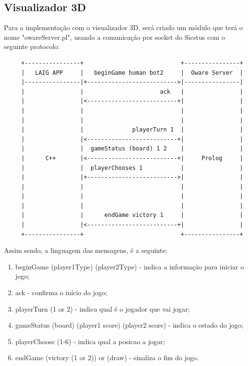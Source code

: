 \documentclass[15pt,a4paper]{article}
\begin{document}
\subsection*{Visualizador 3D}
Para a implementação com o visualizador 3D, será criado um módulo que terá o nome "owareServer.pl", usando a comunicação por socket do Sicstus com o seguinte protocolo:
\begin{verbatim}
     +----------------+                            +----------------+
     |   LAIG APP     |   beginGame human bot2     |  Oware Server  |
     |----------------|+-------------------------->|----------------|
     |                |                      ack   |                |
     |                |<--------------------------+|                |
     |                |                            |                |
     |                |                            |                |
     |                |              playerTurn 1  |                |
     |                |<--------------------------+|                |
     |                |  gameStatus (board) 1 2    |                |
     |      C++       |<--------------------------+|     Prolog     |
     |                |  playerChooses 1           |                |
     |                |+-------------------------->|                |
     |                |                            |                |
     |                |                            |                |
     |                |                            |                |
     |                |      endGame victory 1     |                |
     |                |<--------------------------+|                |
     +----------------+                            +----------------+
\end{verbatim}
Assim sendo, a linguagem das mensagens, é a seguinte:
\begin{enumerate}
\item beginGame (player1Type) (player2Type) - indica a informação para iniciar o jogo;
\item ack - confirma o início do jogo;
\item playerTurn (1 or 2) - indica qual é o jogador que vai jogar;
\item gameStatus (board) (player1 score) (player2 score) - indica o estado do jogo;
\item playerChoose (1-6) - indica qual a posicao a jogar;
\item endGame (victory (1 or 2)) or (draw) - sinaliza o fim do jogo.
\end{enumerate}
\end{document}
